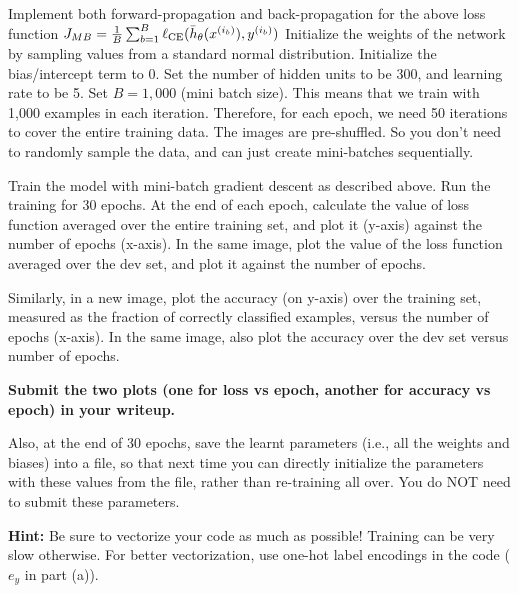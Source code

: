 \item {} 


Implement both forward-propagation and back-propagation for the above loss function $J_{MB} = \frac{1}{B}\sum_{b=1}^B \ell_\textup{CE}(\bar{h}_{\theta}(x^{(i_b)}),y^{(i_b)})$
Initialize the weights of the network by sampling values from a standard normal
distribution. Initialize the bias/intercept term to 0.
Set the number of hidden units to be 300, and learning rate to be 5. Set $B = 1,000$
(mini batch size). This means that we train with 1,000 examples in each iteration.
Therefore, for each epoch, we need 50 iterations to cover the entire training data.
The images are pre-shuffled. So you don't need to randomly sample the data, and can
just create mini-batches sequentially.


Train the model with mini-batch gradient descent
as described above. Run the training for 30 epochs. At the end of each epoch, calculate
the value of loss function averaged over the entire training set, and plot it
(y-axis) against the number of epochs (x-axis). In the same image, plot the value
of the loss function averaged over the dev set, and plot it against the number of epochs.

Similarly, in a new image, plot the accuracy (on y-axis) over the training set,
measured as the fraction of correctly classified examples, versus the number of epochs
(x-axis). In the same image, also plot the accuracy over the dev set versus number of epochs.

\textbf{Submit the two plots (one for loss vs epoch, another for accuracy vs epoch) in your writeup.}

Also, at the end of 30 epochs, save the learnt parameters (i.e., all the weights and biases)
into a file, so that next time you can directly initialize the parameters with
these values from the file, rather than re-training all over. You do NOT need to
submit these parameters.


\textbf{Hint:} Be sure to vectorize your code as much as possible! Training can be
very slow otherwise. For better vectorization, use one-hot label encodings in the code ($e_y$ in part (a)).
